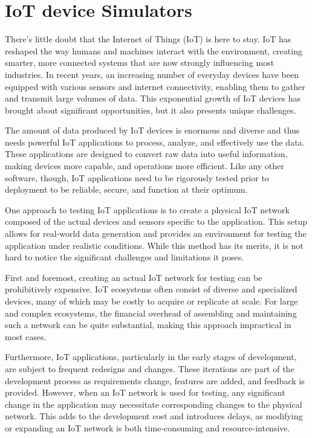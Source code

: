 \section{IoT device Simulators}

There's little doubt that the Internet of Things (IoT) is here to stay. IoT has reshaped the way humans and machines interact with the environment, creating smarter, more connected systems that are now strongly influencing most industries. In recent years, an increasing number of everyday devices have been equipped with various sensors and internet connectivity, enabling them to gather and transmit large volumes of data. This exponential growth of IoT devices has brought about significant opportunities, but it also presents unique challenges.

The amount of data produced by IoT devices is enormous and diverse and thus needs powerful IoT applications to process, analyze, and effectively use the data. These applications are designed to convert raw data into useful information, making devices more capable, and operations more efficient. Like any other software, though, IoT applications need to be rigorously tested prior to deployment to be reliable, secure, and function at their optimum.

One approach to testing IoT applications is to create a physical IoT network composed of the actual devices and sensors specific to the application. This setup allows for real-world data generation and provides an environment for testing the application under realistic conditions. While this method has its merits, it is not hard to notice the significant challenges and limitations it poses.

First and foremost, creating an actual IoT network for testing can be prohibitively expensive. IoT ecosystems often consist of diverse and specialized devices, many of which may be costly to acquire or replicate at scale. For large and complex ecosystems, the financial overhead of assembling and maintaining such a network can be quite substantial, making this approach impractical in most cases.

Furthermore, IoT applications, particularly in the early stages of development, are subject to frequent redesigns and changes. These iterations are part of the development process as requirements change, features are added, and feedback is provided. However, when an IoT network is used for testing, any significant change in the application may necessitate corresponding changes to the physical network. This adds to the development cost and introduces delays, as modifying or expanding an IoT network is both time-consuming and resource-intensive.

